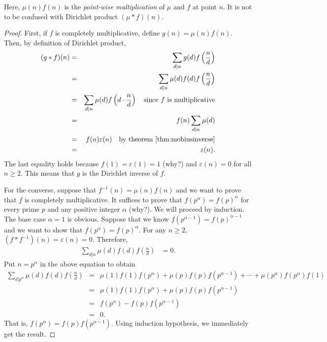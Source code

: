\documentclass[12pt]{subfile}
\begin{document}
		\begin{note}
			Here, $\mu(n)f(n)$ is the \textit{point-wise multiplication} of $\mu$ and $f$ at point $n$. It is not to be confused with Dirichlet product $(\mu \ast f)(n)$.
		\end{note}

		\begin{proof}
			First, if $f$ is completely multiplicative, define $g(n) = \mu(n) f(n)$. Then, by definition of Dirichlet product,
				\begin{eqnarray*}
					(g \ast f)(n) &=& \sum_{d|n} g(d) f\left(\frac{n}{d}\right)\\
								  &=& \sum_{d|n} \mu(d) f(d) f\left(\frac{n}{d}\right)\\
								  &=& \sum_{d|n} \mu(d) f\left(d \cdot \frac{n}{d}\right) \quad \text{since } f \text{ is multiplicative}\\
								  &=& f(n) \sum_{d|n} \mu(d)\\
								  &=& f(n) \varepsilon(n) \quad \text{by theorem \ref{thm:mobiusinverse}}\\
								  &=& \varepsilon(n).
				\end{eqnarray*}
			The last equality holds because $f(1)=\varepsilon(1)=1$ (why?) and $\varepsilon(n)=0$ for all $n \geq 2$. This means that $g$ is the Dirichlet inverse of $f$.

			For the converse, suppose that $f^{-1}(n) = \mu(n) f(n)$ and we want to prove that $f$ is completely multiplicative. It suffices to prove that $f(p^\alpha)=f(p)^\alpha$ for every prime $p$ and any positive integer $\alpha$ (why?). We will proceed by induction. The base case $\alpha =1$ is obvious. Suppose that we know $f(p^{\alpha-1})=f(p)^{\alpha-1}$ and we want to show that $f(p^\alpha)=f(p)^\alpha$. For any $n \geq 2$, $(f\ast f^{-1})(n)=\varepsilon(n)=0$. Therefore,
				\begin{align*}
					\sum_{d|n} \mu(d) f(d) f\left(\frac{n}{d}\right) &= 0.
				\end{align*}
			Put $n=p^\alpha$ in the above equation to obtain
				\begin{eqnarray*}
					\sum_{d|p^\alpha} \mu(d) f(d) f\left(\frac{n}{d}\right)
						&=& \mu(1)f(1)f(p^\alpha) + \mu(p)f(p)f(p^{\alpha -1}) + \cdots +\mu(p^\alpha) f(p^\alpha)f(1)\\
						&=& \mu(1)f(1)f(p^\alpha) + \mu(p)f(p)f(p^{\alpha -1})\\
						&=& f(p^\alpha) - f(p) f(p^{\alpha -1}) \\
						&=& 0.
				\end{eqnarray*}
			That is, $f(p^\alpha) = f(p) f(p^{\alpha -1})$. Using induction hypothesis, we immediately get the result.
		\end{proof}
\end{document}
